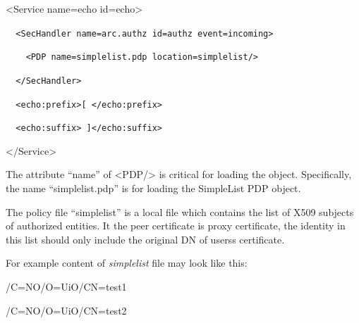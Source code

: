 \documentclass{article}
\begin{document}
{\ttfamily\color{black}
{\textless}Service name={\textquotedbl}echo{\textquotedbl}
id={\textquotedbl}echo{\textquotedbl}{\textgreater}}

{\upshape\color{black}
\foreignlanguage{spanish}{\texttt{\ \ }}\texttt{{\textless}SecHandler
name={\textquotedbl}arc.authz{\textquotedbl}
id={\textquotedbl}authz{\textquotedbl}
event={\textquotedbl}incoming{\textquotedbl}{\textgreater}}}

{\upshape\color{black}
\texttt{\ \ \ \ {\textless}PDP
name={\textquotedbl}}\texttt{simplelist}\texttt{.pdp{\textquotedbl}}\texttt{
location=}\texttt{{\textquotedbl}}\texttt{simplelist}\texttt{{\textquotedbl}}\texttt{/}\texttt{{\textgreater}}}

{\upshape\color{black}
\texttt{\ \ }\foreignlanguage{spanish}{\texttt{{\textless}/SecHandler{\textgreater}}}}

{\upshape\color{black}
\foreignlanguage{spanish}{\texttt{\ \ }}\foreignlanguage{spanish}{\texttt{{\textless}echo:prefix{\textgreater}[
{\textless}/echo:prefix{\textgreater}}}}

{\upshape\color{black}
\foreignlanguage{spanish}{\texttt{\ \ }}\texttt{{\textless}echo:suffix{\textgreater}
]{\textless}/echo:suffix{\textgreater}}}

{\ttfamily\color{black}
{\textless}/Service{\textgreater}}

{\color{black}
The attribute {\textquotedblleft}name{\textquotedblright} of
{\textless}PDP/{\textgreater} is critical for loading the object.
Specifically, the name
{\textquotedblleft}simplelist.pdp{\textquotedblright} is for loading
the SimpleList PDP object.}

{\upshape\color{black}
The policy file {\textquotedblleft}simplelist{\textquotedblright} is a
local file which contains the list of X509 subjects of authorized
entities. It the peer certificate is proxy certificate, the identity in
this list should only include the original DN of
users{\textquotesingle}s certificate.}

{\upshape\color{black}
For example content of \textit{simplelist} file may look like this:}

{\color{black}
/C=NO/O=UiO/CN=test1}

{\color{black}
/C=NO/O=UiO/CN=test2}
\end{document}
